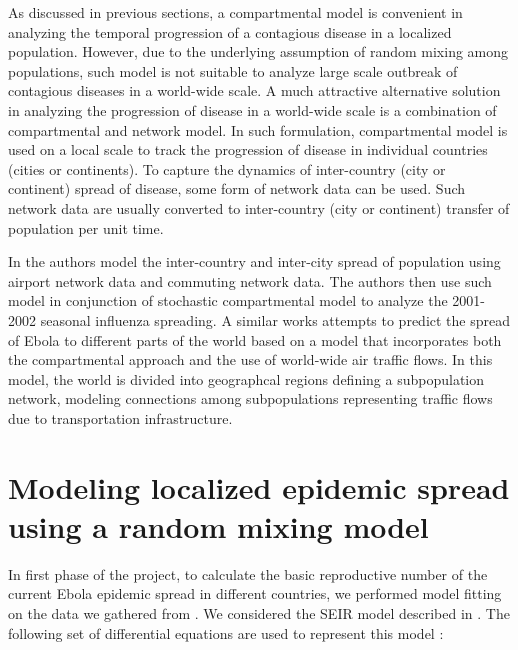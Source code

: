 \documentclass[10pt, journal,onecolumn]{IEEEtran}
\begin{document}
As discussed in previous sections, a compartmental model is convenient in analyzing the temporal progression of a contagious disease in a localized population. However, due to the underlying assumption of random mixing among populations, such model is not suitable to analyze large scale outbreak of contagious diseases in a world-wide scale. A much attractive alternative solution in analyzing the progression of disease in a world-wide scale is a combination of compartmental and network model. In such formulation, compartmental model is used on a local scale to track the progression of disease in individual countries (cities or continents). To capture the dynamics of inter-country (city or continent) spread of disease, some form of network data can be used. Such network data are usually converted to inter-country (city or continent) transfer of population per unit time.

In \citep{balcan2010modeling} the authors model the inter-country and inter-city spread of population using airport network data and commuting network data. The authors then use such model in conjunction of stochastic compartmental model to analyze the  2001-2002 seasonal influenza spreading. A similar works  \citep{gomes2014assessing}  attempts to predict the spread of Ebola to different parts of the world based on a model that incorporates both the compartmental approach and the use of world-wide air traffic flows. In this model, the world is divided into geographcal regions defining a subpopulation network, modeling connections among subpopulations representing traffic flows due to transportation infrastructure.

\bigskip






\section{Modeling localized epidemic spread using a random mixing model}
\label{sec:IntraCountry}

In first phase of the project, to calculate the basic reproductive number of the current Ebola
epidemic spread in different countries, we performed model fitting on the data we gathered from
\cite{cmriversdata}. We considered the SEIR model described in \cite{chowell2004basic}. The following set of differential equations are used to represent this model \cite{chowell2004basic}:
\end{document}
